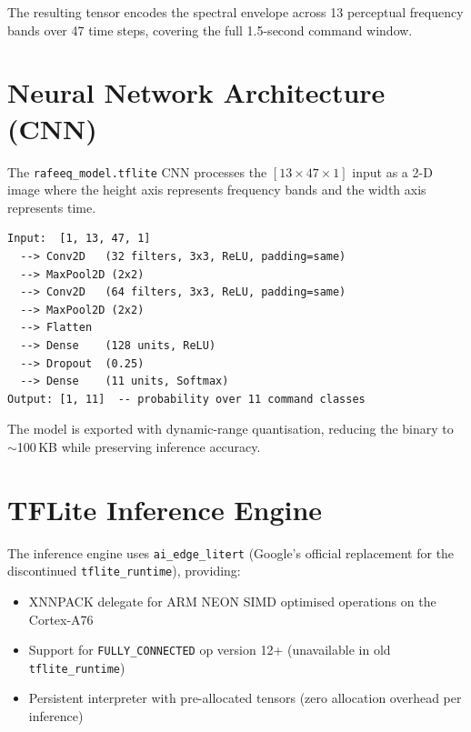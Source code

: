 \documentclass[12pt, a4paper]{report}
\begin{document}
The resulting tensor encodes the spectral envelope across 13 perceptual frequency bands
over 47 time steps, covering the full 1.5-second command window.

\section{Neural Network Architecture (CNN)}

The \texttt{rafeeq\_model.tflite} CNN processes the $[13 \times 47 \times 1]$ input as
a 2-D image where the height axis represents frequency bands and the width axis
represents time.

\begin{lstlisting}[caption={KWS CNN architecture summary}]
Input:  [1, 13, 47, 1]
  --> Conv2D   (32 filters, 3x3, ReLU, padding=same)
  --> MaxPool2D (2x2)
  --> Conv2D   (64 filters, 3x3, ReLU, padding=same)
  --> MaxPool2D (2x2)
  --> Flatten
  --> Dense    (128 units, ReLU)
  --> Dropout  (0.25)
  --> Dense    (11 units, Softmax)
Output: [1, 11]  -- probability over 11 command classes
\end{lstlisting}

The model is exported with dynamic-range quantisation, reducing the binary to
$\sim$100\,KB while preserving inference accuracy.

\section{TFLite Inference Engine}

The inference engine uses \texttt{ai\_edge\_litert} (Google's official replacement for
the discontinued \texttt{tflite\_runtime}), providing:

\begin{itemize}[noitemsep]
  \item XNNPACK delegate for ARM NEON SIMD optimised operations on the Cortex-A76
  \item Support for \texttt{FULLY\_CONNECTED} op version 12+ (unavailable in old
        \texttt{tflite\_runtime})
  \item Persistent interpreter with pre-allocated tensors (zero allocation overhead
        per inference)
\end{itemize}
\end{document}
